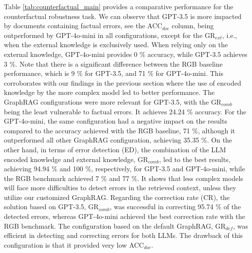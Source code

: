 \documentclass[letterpaper, 10 pt, conference]{ieeeconf}  %
\begin{document}
Table \ref{tab:counterfactual_main} provides a comparative performance for the counterfactual robustness task. We can observe that GPT-3.5 is more impacted by documents containing factual errors, see the ACC$_{doc}$ column, being outperformed by GPT-4o-mini in all configurations, except for the GR$_{ext}$, i.e., when the external knowledge is exclusively used. When relying only on the external knowledge, GPT-4o-mini provides 0 \% accuracy, while GPT-3.5 achieves 3 \%. Note that there is a significant difference between the RGB baseline performance, which is 9 \% for GPT-3.5, and 71 \% for GPT-4o-mini. This corroborates with our findings in the previous section where the use of encoded knowledge by the more complex model led to better performance. The GraphRAG configurations were more relevant for GPT-3.5, with the GR$_{comb}$ being the least vulnerable to factual errors. It achieves 24.24 \% accuracy. For the GPT-4o-mini, the same configuration had a negative impact on the results compared to the accuracy achieved with the RGB baseline, 71 \%, although it outperformed all other GraphRAG configuration, achieving 35.35 \%. On the other hand, in terms of error detection (ED), the combination of the LLM encoded knowledge and external knowledge, GR$_{comb}$, led to the best results, achieving 94.94 \% and 100 \%, respectively, for GPT-3.5 and GPT-4o-mini, while the RGB benchmark achieved 7 \% and 77 \%. It shows that less complex models will face more difficulties to detect errors in the retrieved context, unless they utilize our customized GraphRAG. Regarding the correction rate (CR), the solution based on GPT-3.5, GR$_{comb}$, was successful in correcting 95.74 \% of the detected errors, whereas GPT-4o-mini achieved the best correction rate with the RGB benchmark. The configuration based on the default GraphRAG, GR$_{def}$, was efficient in detecting and correcting errors for both LLMs. The drawback of this configuration is that it provided very low ACC$_{doc}$. 

\begin{table}
\caption{Comparative analysis for the information integration task measured in terms of accuracy (\%) for different noise ratios..}
\centering
\small
\setlength{\tabcolsep}{6.0pt} %
\renewcommand*{\arraystretch}{0.70}


\label{tab:integration_main}

\end{table}
\end{document}
